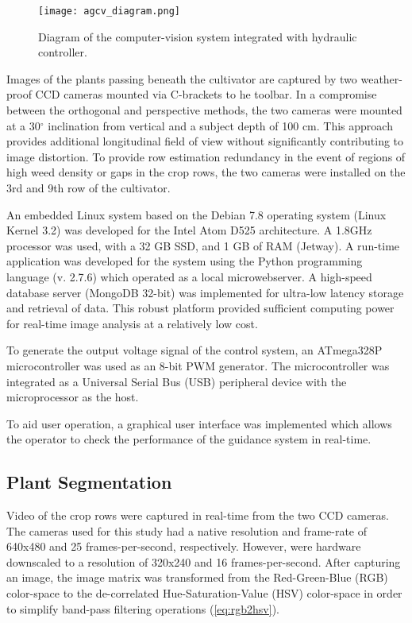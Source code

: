\begin{figure}
  \centering
  \texttt{[image: agcv\_diagram.png]}
  \caption{Diagram of the computer-vision system integrated with hydraulic controller.}
\end{figure}

Images of the plants passing beneath the cultivator are captured by
two weather-proof CCD cameras mounted via C-brackets to he toolbar. 
In a compromise between the orthogonal and perspective
methods, the two cameras were mounted at a 30$^{\circ}$ inclination from
vertical and a subject depth of 100 cm. This approach provides
additional longitudinal field of view without significantly
contributing to image distortion. To provide row estimation redundancy
in the event of regions of high weed density or gaps in the crop rows,
the two cameras were installed on the 3rd and 9th row of the
cultivator.

An embedded Linux system based on the Debian 7.8 operating system
(Linux Kernel 3.2) was developed for the Intel Atom D525
architecture. A 1.8GHz processor was used, with a 32 GB SSD, and 1 GB
of RAM (Jetway). A run-time application was developed for the system
using the Python programming language (v. 2.7.6) which operated as a
local microwebserver. A high-speed database server (MongoDB 32-bit)
was implemented for ultra-low latency storage and retrieval of
data. This robust platform provided sufficient computing power for
real-time image analysis at a relatively low cost.

To generate the output voltage signal of the control system, an
ATmega328P microcontroller was used as an 8-bit PWM generator. The
microcontroller was integrated as a Universal Serial Bus (USB)
peripheral device with the microprocessor as the host.

To aid user operation, a graphical user interface  was
implemented which allows the operator to check the performance of the
guidance system in real-time.

\subsection{Plant Segmentation}
Video of the crop rows were captured in real-time from the two CCD
cameras. The cameras used for this study had a native resolution and
frame-rate of 640x480 and 25 frames-per-second, respectively. However,
were hardware downscaled to a resolution of 320x240 and 16
frames-per-second. After capturing an image, the image matrix was
transformed from the Red-Green-Blue (RGB) color-space to the
de-correlated Hue-Saturation-Value (HSV) color-space in order to
simplify band-pass filtering operations (\ref{eq:rgb2hsv}).

